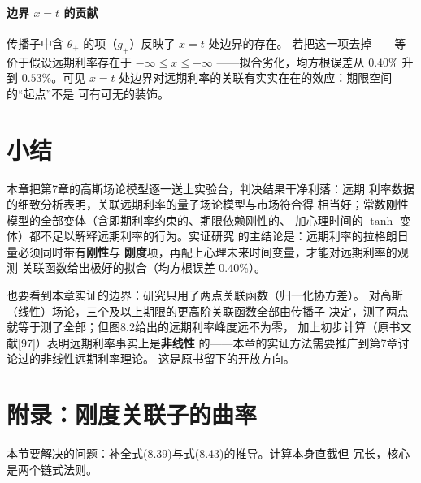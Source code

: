 \paragraph{边界 $x=t$ 的贡献}
传播子中含 $\theta_{+}$ 的项（$g_{+}$）反映了 $x=t$ 处边界的存在。
若把这一项去掉——等价于假设远期利率存在于 $-\infty\le x\le+\infty$
——拟合劣化，均方根误差从 $0.40\%$ 升到 $0.53\%$。可见 $x=t$
处边界对远期利率的关联有实实在在的效应：期限空间的“起点”不是
可有可无的装饰。

\section{小结}

本章把第7章的高斯场论模型逐一送上实验台，判决结果干净利落：远期
利率数据的细致分析表明，关联远期利率的量子场论模型与市场符合得
相当好；常数刚性模型的全部变体（含即期利率约束的、期限依赖刚性的、
加心理时间的 $\tanh$ 变体）都不足以解释远期利率的行为。实证研究
的主结论是：远期利率的拉格朗日量必须同时带有\textbf{刚性}与
\textbf{刚度}项，再配上心理未来时间变量，才能对远期利率的观测
关联函数给出极好的拟合（均方根误差 $0.40\%$）。

也要看到本章实证的边界：研究只用了两点关联函数（归一化协方差）。
对高斯（线性）场论，三个及以上期限的更高阶关联函数全部由传播子
决定，测了两点就等于测了全部；但图8.2给出的远期利率峰度远不为零，
加上初步计算（原书文献[97]）表明远期利率事实上是\textbf{非线性}
的——本章的实证方法需要推广到第7章讨论过的非线性远期利率理论。
这是原书留下的开放方向。

\section{附录：刚度关联子的曲率}

本节要解决的问题：补全式(8.39)与式(8.43)的推导。计算本身直截但
冗长，核心是两个链式法则。

